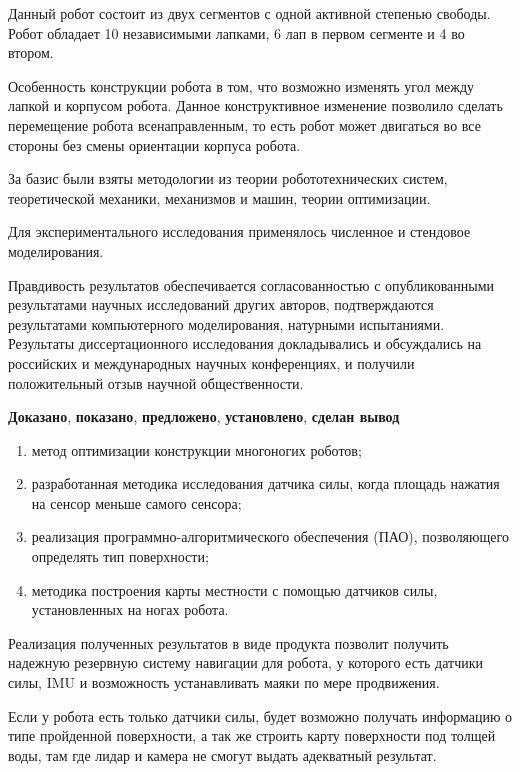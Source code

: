 Данный робот состоит из двух сегментов с одной активной степенью свободы. Робот обладает 10 независимыми лапками, 6 лап в первом сегменте и 4 во втором.

Особенность конструкции робота в том, что возможно изменять угол между лапкой и корпусом робота. Данное конструктивное изменение позволило сделать перемещение робота всенаправленным, то есть робот может двигаться во все стороны без смены ориентации корпуса робота.


{\methods} За базис были взяты методологии из теории робототехнических систем, теоретической механики, механизмов и машин, теории оптимизации.

Для экспериментального исследования применялось численное и стендовое моделирования.

{\reliability} Правдивость результатов обеспечивается согласованностью с опубликованными результатами научных исследований других авторов, подтверждаются результатами компьютерного моделирования, натурными испытаниями. Результаты диссертационного исследования докладывались и обсуждались на российских и международных научных конференциях, и получили положительный отзыв научной общественности.


{\novelty}
\textbf{Доказано}, \textbf{показано}, \textbf{предложено}, \textbf{установлено}, \textbf{сделан вывод}


{}
\begin{enumerate}[beginpenalty=10000] %
  \item метод оптимизации конструкции многоногих роботов;
  \item разработанная методика исследования датчика силы, когда площадь нажатия на сенсор меньше самого сенсора;
  \item реализация программно-алгоритмического обеспечения (ПАО), позволяющего определять тип поверхности;
  \item методика построения карты местности с помощью датчиков силы, установленных на ногах робота.
\end{enumerate}


{\influence} Реализация полученных результатов в виде продукта позволит получить надежную резервную систему навигации для робота, у которого есть датчики силы, IMU и возможность устанавливать маяки по мере продвижения.

Если у робота есть только датчики силы, будет возможно получать информацию о типе пройденной поверхности, а так же строить карту поверхности под толщей воды, там где лидар и камера не смогут выдать адекватный результат.



